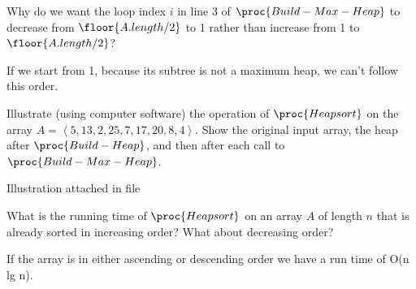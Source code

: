 \documentclass[11pt,addpoints]{exam}
\begin{document}
\begin{questions}
\ifprintanswers
\newpage
\else
\bigskip
\fi
	
	
%
\question[5]
Why do we want the loop index $i$ in line 3 of $\proc{Build-Max-Heap}$ to decrease from $\floor{A.length/2}$ to 1 rather than increase from 1 to $\floor{A.length/2}$?

\begin{center}
	If we start from 1, because its subtree is not a maximum heap, we can't follow this order.
\end{center}

\ifprintanswers
\newpage
\else
\bigskip
\fi
	
	
%
\question[10]
Illustrate (using computer software) the operation of $\proc{Heapsort}$ on the array $A = \left< 5, 13, 2, 25, 7, 17, 20, 8, 4 \right>$.  Show the original input array, the heap after $\proc{Build-Heap}$, and then after each call to $\proc{Build-Max-Heap}$.

\begin{center}	
	Illustration attached in file
\end{center}

\ifprintanswers
\newpage
\else
\bigskip
\fi
	
	
%
\question[5]
What is the running time of $\proc{Heapsort}$ on an array $A$ of length $n$ that is already sorted in increasing order?  What about decreasing order?

\begin{center}	
If the array is in either ascending or descending order we have a run time of O(n lg n).
\end{center}


%
\end{questions}
\end{document}
